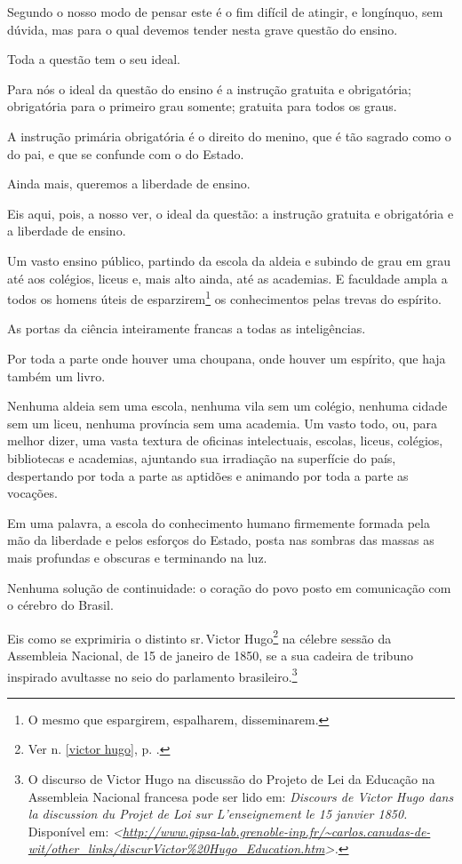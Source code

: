 Segundo o nosso modo de pensar este é o fim difícil de atingir, e
longínquo, sem dúvida, mas para o qual devemos tender nesta grave
questão do ensino.

Toda a questão tem o seu ideal.

Para nós o ideal da questão do ensino é a instrução gratuita e
obrigatória; obrigatória para o primeiro grau somente; gratuita para
todos os graus.

A instrução primária obrigatória é o direito do menino, que é tão
sagrado como o do pai, e que se confunde com o do Estado.

Ainda mais, queremos a liberdade de ensino.

Eis aqui, pois, a nosso ver, o ideal da questão: a instrução gratuita e
obrigatória e a liberdade de ensino.

Um vasto ensino público, partindo da escola da aldeia e subindo de grau
em grau até aos colégios, liceus e, mais alto ainda, até as academias. E
faculdade ampla a todos os homens úteis de esparzirem\footnote{O mesmo
  que espargirem, espalharem, disseminarem.} os conhecimentos pelas
trevas do espírito.

As portas da ciência inteiramente francas a todas as inteligências.

Por toda a parte onde houver uma choupana, onde houver um espírito, que
haja também um livro.

Nenhuma aldeia sem uma escola, nenhuma vila sem um colégio, nenhuma
cidade sem um liceu, nenhuma província sem uma academia. Um vasto todo,
ou, para melhor dizer, uma vasta textura de oficinas intelectuais,
escolas, liceus, colégios, bibliotecas e academias, ajuntando sua
irradiação na superfície do país, despertando por toda a parte as
aptidões e animando por toda a parte as vocações.

Em uma palavra, a escola do conhecimento humano firmemente formada pela
mão da liberdade e pelos esforços do Estado, posta nas sombras das
massas as mais profundas e obscuras e terminando na luz.

Nenhuma solução de continuidade: o coração do povo posto em comunicação
com o cérebro do Brasil.

Eis como se exprimiria o distinto sr.\,Victor Hugo\footnote{Ver n. \ref{victor hugo}, p. \pageref{victor hugo}.} 
na célebre sessão da Assembleia Nacional, de 15 de janeiro de 1850, se a
sua cadeira de tribuno inspirado avultasse no seio do parlamento
brasileiro.\footnote{O discurso de Victor Hugo na discussão do Projeto \label{discours}
  de Lei da Educação na Assembleia Nacional francesa pode ser lido em:
  \emph{Discours de Victor Hugo dans la discussion du Projet de Loi sur
  L'enseignement le 15 janvier 1850.} Disponível em:
  \emph{\textless{}\url{http://www.gipsa-lab.grenoble-inp.fr/~carlos.canudas-de-wit/other_links/discurVictor\%20Hugo_Education.htm}\textgreater.}}

